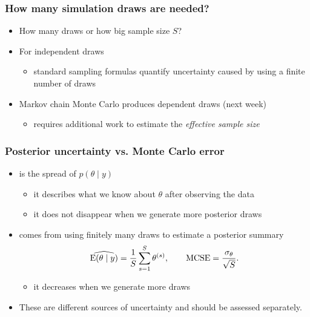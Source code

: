 \documentclass[10pt]{beamer}
\begin{document}
\begin{frame}


\frametitle{How many simulation draws are needed?}

  \begin{itemize}
  \item How many draws or how big sample size $S$?
  \item For independent draws
    \begin{itemize}
    \item standard sampling formulas quantify uncertainty caused by using
      a finite number of draws
    \end{itemize}
  \item Markov chain Monte Carlo produces dependent draws (next week)
    \begin{itemize}
    \item requires additional work to estimate the \emph{effective
        sample size}
    \end{itemize}
  \end{itemize}

\end{frame}

\begin{frame}

\frametitle{Posterior uncertainty vs. Monte Carlo error}

  \begin{itemize}
  \item {} is the spread of $p(\theta\mid y)$
    \begin{itemize}
      \item it describes what we know about $\theta$ after observing the data
      \item it does not disappear when we generate more posterior draws
    \end{itemize}
  \pause
  \item {} comes from using finitely many draws
    to estimate a posterior summary
    \[
      \widehat{\mathrm{E}(\theta\mid y)}=\frac{1}{S}\sum_{s=1}^S\theta^{(s)},
      \qquad
      \operatorname{MCSE}=\frac{\sigma_\theta}{\sqrt S}.
    \]
    \begin{itemize}
      \item it decreases when we generate more draws
    \end{itemize}
  \pause
  \item These are different sources of uncertainty and should be
    assessed separately.
  \end{itemize}

\end{frame}
\end{document}
